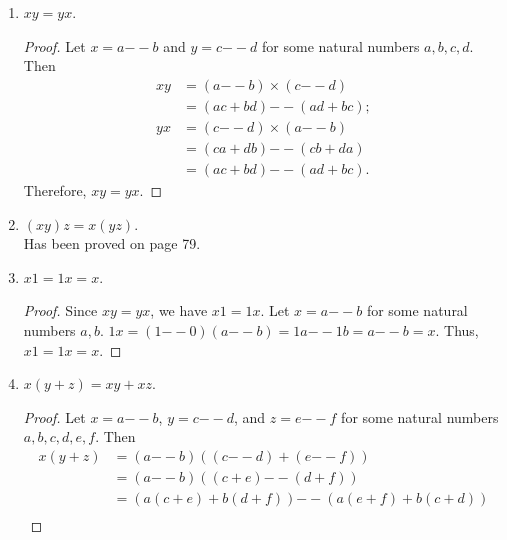 \documentclass[12pt, letter]{article}
\begin{document}
\begin{enumerate}
    \begin{proof}
        Since $x+y=y+x$, we have $x+(-x)=(-x)+x$. Let $x=a\mathtt{--}b$ for some natural numbers $a,b$, then $-x=b\mathtt{--}a$. Write $0$ as $0\mathtt{--}0$. 
        Then $x+(-x)=(a\mathtt{--}b)+(b\mathtt{--}a)=(a+b)\mathtt{--}(b+a)$. Since $(a+b)+0=(b+a)+0=a+b$, we have that $(a+b)\mathtt{--}(b+a)=0\mathtt{--}0$. So $x+(-x)=0$. Thus, $x+(-x)=(-x)+x=0$.
    \end{proof}
    \item $xy=yx$.
    \begin{proof}
        Let $x=a\mathtt{--}b$ and $y=c\mathtt{--}d$ for some natural numbers $a,b,c,d$. Then 
        \begin{equation*}
            \begin{aligned}
                xy&=(a\mathtt{--}b)\times (c\mathtt{--}d)\\
                &=(ac+bd)\mathtt{--}(ad+bc);\\
                yx&=(c\mathtt{--}d)\times (a\mathtt{--}b)\\
                &=(ca+db)\mathtt{--}(cb+da)\\
                &=(ac+bd)\mathtt{--}(ad+bc).
            \end{aligned}
        \end{equation*}
        Therefore, $xy=yx$.
    \end{proof}
    \item $(xy)z=x(yz)$.\\
    Has been proved on page 79.
    \item $x1=1x=x$.
    \begin{proof}
        Since $xy=yx$, we have $x1=1x$. Let $x=a\mathtt{--}b$ for some natural numbers $a,b$. $1x=(1\mathtt{--}0)(a\mathtt{--}b)=1a\mathtt{--}1b=a\mathtt{--}b=x$. Thus, $x1=1x=x$.
    \end{proof}
    \item $x(y+z)=xy+xz$.
    \begin{proof}
        Let $x=a\mathtt{--}b$, $y=c\mathtt{--}d$, and $z=e\mathtt{--}f$ for some natural numbers $a,b,c,d,e,f$. Then 
        \begin{equation*}
            \begin{aligned}
                x(y+z)&=(a\mathtt{--}b)((c\mathtt{--}d)+(e\mathtt{--}f))\\
                &=(a\mathtt{--}b)((c+e)\mathtt{--}(d+f))\\
                &=(a(c+e)+b(d+f))\mathtt{--}(a(e+f)+b(c+d))\\

\end{aligned}
\end{equation*}
\end{proof}
\end{enumerate}
\end{document}
